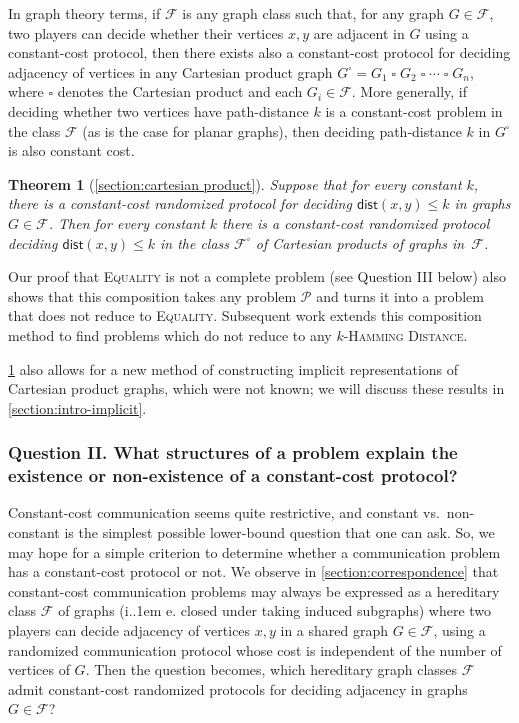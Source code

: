 \documentclass{article}
\makeatletter
\newtheorem{theorem}{Theorem}\newtheorem{lemma}[theorem]{Lemma}\newtheorem{proposition}[theorem]{Proposition}\newtheorem{corollary}[theorem]{Corollary}\newtheorem{definition}[theorem]{Definition}\newtheorem{claim}[theorem]{Claim}\newtheorem{remark}[theorem]{Remark}\newtheorem{observation}[theorem]{Observation}\newtheorem{conjecture}[theorem]{Conjecture}\newtheorem{example}[theorem]{Example}
\newcommand{\dist}{\mathsf{dist}}
\newcommand{\cF}{\ensuremath{\mathcal{F}}}
\newcommand{\cP}{\ensuremath{\mathcal{P}}}
\newcommand*\ie{i.\kern.1em e.\@\xspace} %
\makeatother
\begin{document}
In graph theory terms, if $\cF$ is any graph class such that, for any graph $G \in \cF$, two players
can decide whether their vertices $x,y$ are adjacent in $G$ using a constant-cost protocol, then
there exists also a constant-cost protocol for deciding adjacency of vertices in any Cartesian
product graph $G^\square = G_1 \mathbin\square G_2 \mathbin\square \dotsm \mathbin\square G_n$,
where $\square$ denotes the Cartesian product and each $G_i \in \cF$. More generally, if deciding whether
two vertices have path-distance $k$ is a constant-cost problem in the class $\cF$ (as is the case
for planar graphs), then deciding path-distance $k$ in $G^\square$ is also constant cost.

\begin{theorem}[\cref{section:cartesian product}]
\label{thm:intro-products}
Suppose that for every constant $k$, there is a constant-cost randomized protocol for deciding
$\dist(x,y) \leq k$ in graphs $G \in \cF$. Then for every constant $k$ there is a constant-cost
randomized protocol deciding $\dist(x,y) \leq k$ in the class $\cF^\square$ of Cartesian products of graphs in~$\cF$.
\end{theorem}

Our proof that \textsc{Equality} is not a complete problem (see Question III below) also shows that
this composition takes any problem $\cP$ and turns it into a problem that does not reduce to
\textsc{Equality}. Subsequent work \cite{FGHH24} extends this composition method to find problems
which do not reduce to any \textsc{$k$-Hamming Distance}.

\cref{thm:intro-products} also allows for a new method of constructing implicit representations of Cartesian
product graphs, which were not known; we will discuss these results in
\cref{section:intro-implicit}.

\subsubsection*{Question II. What structures of a problem explain the existence or non-existence of
a constant-cost protocol?}

Constant-cost communication seems quite restrictive, and constant vs.~non-constant is the
simplest possible lower-bound question that one can ask. So, we may hope for a simple criterion to
determine whether a communication problem has a constant-cost protocol or not. We observe in
\cref{section:correspondence} that constant-cost communication problems may always be expressed as a
hereditary  class $\cF$ of graphs (\ie closed under taking induced subgraphs) where two players can
decide adjacency of vertices $x,y$ in a shared graph $G \in \cF$, using a randomized communication
protocol whose cost is independent of the number of vertices of $G$. Then the question becomes,
which hereditary graph classes $\cF$ admit constant-cost randomized protocols for deciding adjacency
in graphs $G \in \cF$? \\
\end{document}
